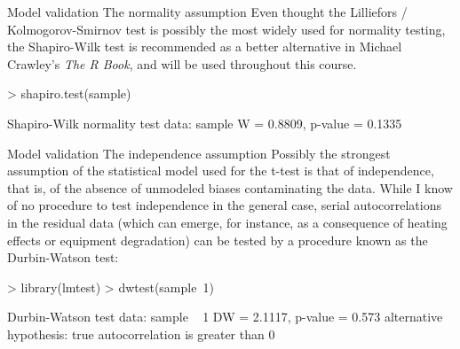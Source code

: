 \documentclass[t]{beamer}
\begin{document}

\begin{ftstf}
{Model validation}
{The normality assumption}
Even thought the Lilliefors / Kolmogorov-Smirnov test is possibly the most widely used for normality testing, the Shapiro-Wilk test is recommended as a better alternative in Michael Crawley's \textit{The R Book}, and will be used throughout this course.
\vhalf
\begin{rcode}
> shapiro.test(sample)

Shapiro-Wilk normality test
data:  sample
W = 0.8809, p-value = 0.1335
\end{rcode}
\end{ftstf}


\begin{ftstf}
{Model validation}
{The independence assumption}
Possibly the strongest assumption of the statistical model used for the t-test is that of independence, that is, of the absence of unmodeled biases contaminating the data.
\vhalf
While I know of no procedure to test independence in the general case, serial autocorrelations in the residual data (which can emerge, for instance, as a consequence of heating effects or equipment degradation) can be tested by a procedure known as the Durbin-Watson test:
\begin{rcode}
> library(lmtest)
> dwtest(sample~1)

Durbin-Watson test
data:  sample ~ 1
DW = 2.1117, p-value = 0.573
alternative hypothesis: true autocorrelation is greater than 0
\end{rcode}
\end{ftstf}
\end{document}
